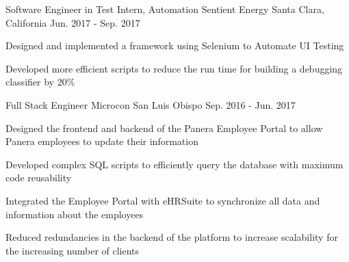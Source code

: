 


\begin{cventries}


\cventry
{Software Engineer in Test Intern, Automation} %
{Sentient Energy} %
{Santa Clara, California} %
{Jun. 2017 - Sep. 2017} %
{ %
\begin{cvitems}
\item {Designed and implemented a framework using Selenium to Automate UI Testing}
\item {Developed more efficient scripts to reduce the run time for building a debugging classifier by 20\%}
\end{cvitems}
}


\cventry
{Full Stack Engineer} %
{Microcon} %
{San Luis Obispo} %
{Sep. 2016 - Jun. 2017} %
{ %
\begin{cvitems}
\item {Designed the frontend and backend of the Panera Employee Portal to allow Panera employees to update their information}
\item {Developed complex SQL scripts to efficiently query the database with maximum code reusability}
\item {Integrated the Employee Portal with eHRSuite to synchronize all data and information about the employees}
\item {Reduced redundancies in the backend of the platform to increase scalability for the increasing number of clients}
\end{cvitems}
}


{%


}








\end{cventries}
